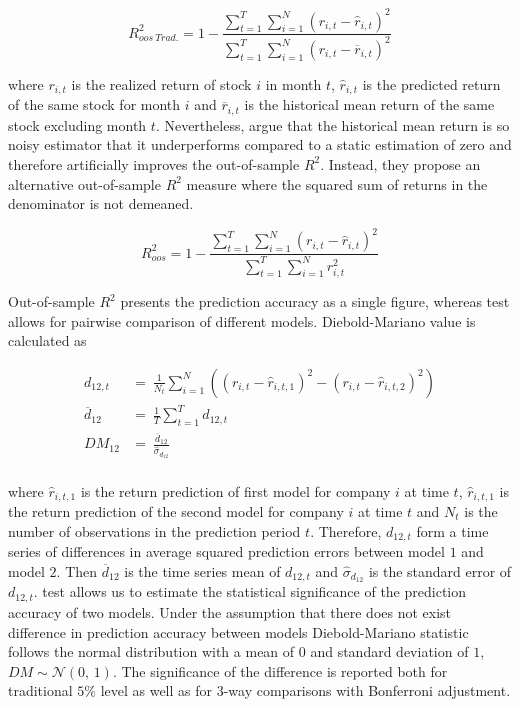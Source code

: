 \documentclass[12pt]{article}
\begin{document}
\begin{equation}
\label{eq:r2Trad}
R^{2}_{oos \ Trad.} = 1 - \frac{\sum^T_{t=1} \sum^N_{i=1} (r_{i, t} - \hat r_{i, t})^2}{ \sum^T_{t=1} \sum^N_{i=1} (r_{i, t} - \overline{r}_{i, t} )^2}
\end{equation}

where $r_{i, t}$ is the realized return of stock $i$ in month $t$, $\hat r_{i, t}$ is the predicted return of the same stock for month $i$ and $\overline{r}_{i, t}$ is the historical mean return of the same stock excluding month $t$. Nevertheless, \citet{guetal} argue that the historical mean return is so noisy estimator that it underperforms compared to a static estimation of zero and therefore artificially improves the out-of-sample $R^{2}$.\footnotemark {} Instead, they propose an alternative out-of-sample $R^{2}$ measure where the squared sum of returns in the denominator is not demeaned. \par

\begin{equation}
\label{eq:r2}
R^{2}_{oos} = 1 - \frac{\sum^T_{t=1} \sum^N_{i=1} (r_{i, t} - \hat r_{i, t})^2}{ \sum^T_{t=1} \sum^N_{i=1} r^2_{i, t}}
\end{equation}

Out-of-sample $R^2$ presents the prediction accuracy as a single figure, whereas \citet{Diebold1995} test allows for pairwise comparison of different models. Diebold-Mariano value is calculated as \par

\begin{equation}
\label{eq:Diebold-Mariano}
\begin{split}
 d_{12, t} 			& = \ \frac{1}{N_{t}}  \sum^N_{i=1}((r_{i, t} - \hat r_{i, t, 1})^2 - (r_{i, t} - \hat r_{i, t, 2})^2) \\
\overline{d}_{12} 	& = \ \frac{1}{T} \sum^T_{t=1} d_{12, t} \\
DM_{12} 			& = \ \frac{\overline{d}_{12}}{\hat \sigma_{d_{12}}} \\
\end{split}
\end{equation}

where $\hat r_{i, t, 1}$ is the return prediction of first model for company $i$ at time $t$, $\hat r_{i, t, 1}$ is the return prediction of the second model  for company $i$ at time $t$ and $N_t$ is the number of observations in the prediction period $t$. Therefore, $d_{12, t}$ form a time series of differences in average squared prediction errors between model $1$ and model $2$. Then $\overline{d}_{12}$ is the time series mean of $d_{12, t}$ and $\hat \sigma_{d_{12}}$ is the \citet{Newey1987} standard error of $d_{12, t}$. \citet{Diebold1995} test allows us to estimate the statistical significance of the prediction accuracy of two models. Under the assumption that there does not exist difference in prediction accuracy between models Diebold-Mariano statistic follows the normal distribution with a mean of $0$ and standard deviation of $1$, $DM \sim \mathcal{N}(0,\, 1)$. The significance of the difference is reported both for traditional $5\%$ level as well as for 3-way comparisons with Bonferroni adjustment. \par
\end{document}
